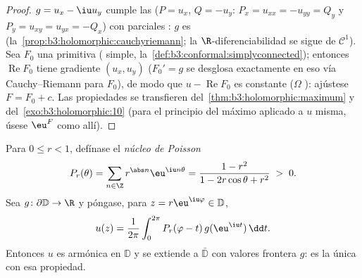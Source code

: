 \begin{proof}
$g = u_x - \iu u_y$ cumple las
 ($P = u_x$, $Q = -u_y$: $P_x = u_{xx} = -u_{yy} = Q_y$
y $P_y = u_{xy} = u_{yx} = -Q_x$) con parciales
: $g$ es
(la~\cref{prop:b3:holomorphic:cauchyriemann}; la $\R$-diferenciabilidad
se sigue de $\mathcal C^1$). Sea $F_0$ una primitiva ( simple,
la~\cref{def:b3:conformal:simplyconnected}); entonces
$\operatorname{Re}F_0$ tiene gradiente $(u_x, u_y)$ ($F_0' = g$ se
desglosa exactamente en eso vía Cauchy--Riemann para $F_0$), de modo que
$u - \operatorname{Re}F_0$ es constante ($\Omega$
): ajústese $F = F_0 + c$. Las
propiedades se transfieren del~\cref{thm:b3:holomorphic:maximum} y
del~\cref{exo:b3:holomorphic:10} (para el principio del máximo aplicado
a $u$ misma, úsese $\eu^{F}$ como allí).
\end{proof}

\begin{theorem}\label{thm:b3:conformal:poisson} Para $0 \leq r < 1$, defínase el
\emph{núcleo de Poisson}
\[
P_r(\theta) = \sum_{n\in\Z}r^{\abs n}\eu^{\iu n\theta}
= \frac{1 - r^2}{1 - 2r\cos\theta + r^2} \;>\; 0 .
\]
Sea $g \colon \partial\mathbb D \to \R$
 y póngase, para
$z = r\eu^{\iu\varphi} \in \mathbb D$,
\[
u(z) = \frac1{2\pi}\int_0^{2\pi}
P_r(\varphi - t)\,g(\eu^{\iu t})\,\dd t .
\]
Entonces $u$ es armónica en $\mathbb D$ y se extiende
 a $\bar{\mathbb D}$
con valores frontera $g$: es la única
 con esa
propiedad.
\end{theorem}


